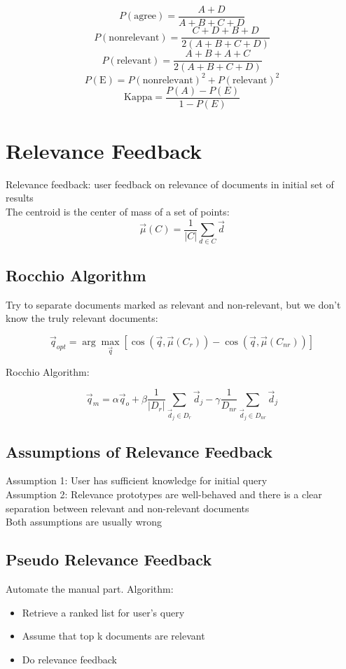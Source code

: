 \begin{multicols*}{2}
$$P(\text{agree}) = \frac{A+D}{A+B+C+D}$$
$$P(\text{nonrelevant}) = \frac{C + D + B +D}{2(A+B+C+D)}$$
$$P(\text{relevant}) = \frac{A+B+A+C}{2(A+B+C+D)}$$
$$P(\text{E}) = P(\text{nonrelevant})^2 + P(\text{relevant})^2$$
$$\text{Kappa}=\frac{P(A)-P(E)}{1-P(E)}$$

\section{Relevance Feedback}

\noindent Relevance feedback: user feedback on relevance of documents in initial set of results \\

\noindent The centroid is the center of mass of a set of points:
$$\vec{\mu}(C)=\frac{1}{|C|} \sum_{d\in C} \vec{d}$$

\subsection{Rocchio Algorithm}
\noindent Try to separate documents marked as relevant and non-relevant, but we don’t know the truly relevant documents:

$$\vec{q}_{opt}=\arg\!\max_{\vec{q}}[ \cos(\vec{q},\vec{\mu}(C_r)) - \cos(\vec{q},\vec{\mu}(C_{nr}))]$$

\noindent Rocchio Algorithm:

$$\vec{q}_m = \alpha \vec{q}_o + \beta \frac{1}{|D_r|} \sum_{\vec{d}_j \in D_r} \vec{d}_j - \gamma \frac{1}{D_{nr}} \sum_{\vec{d}_j \in D_{nr}} \vec{d}_j$$

\subsection{Assumptions of Relevance Feedback}

\noindent Assumption 1: User has sufficient knowledge for initial query \\

\noindent Assumption 2: Relevance prototypes are well-behaved and there is a clear separation between relevant and non-relevant documents\\

\noindent Both assumptions are usually wrong

\subsection{Pseudo Relevance Feedback}
Automate the manual part. Algorithm:
\begin{itemize}
    \item Retrieve a ranked list for user’s query
    \item Assume that top k documents are relevant
    \item Do relevance feedback
\end{itemize}


\end{multicols*}
